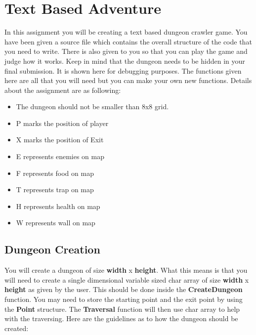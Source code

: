 \documentclass[a4paper,12pt]{article}
\begin{document}
\newpage

\section{Text Based Adventure}
In this assignment you will be creating a text based dungeon crawler game. You have been given a source file  which contains the overall structure of the code that you need to write. There is also  given to you so that you can play the game and judge how it works. Keep in mind that the dungeon needs to be hidden in your final submission. It is shown here for debugging purposes. The functions given here are all that you will need but you can make your own new functions. Details about the assignment are as following:

\begin{itemize}
	\item The dungeon should not be smaller than 8x8 grid.
	\item P marks the position of player
	\item X marks the position of Exit
	\item E represents enemies on map
	\item F represents food on map
	\item T represents trap on map
	\item H represents health on map
	\item W represents wall on map
\end{itemize}

\subsection{Dungeon Creation}
You will create a dungeon of size \textbf{width} x \textbf{height}. What this means is that you will need to create a single dimensional variable sized char array of size \textbf{width} x \textbf{height} as given by the user. This should be done inside the \textbf{CreateDungeon} function. You may need to store the starting point and the exit point by using the \textbf{Point} structure. The \textbf{Traversal} function will then use char array to help with the traversing. Here are the guidelines as to how the dungeon should be created:
\end{document}
